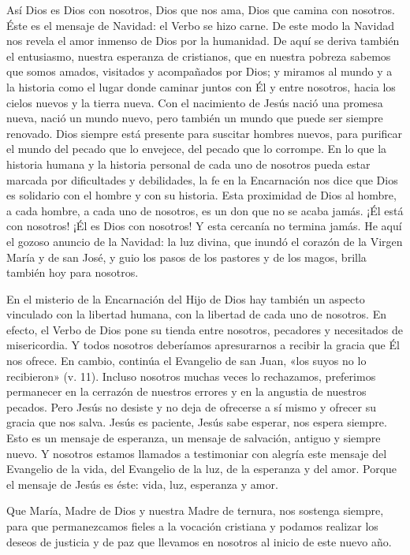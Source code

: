 \documentclass[]{article}
\begin{document}
Así Dios es Dios con nosotros, Dios que nos ama, Dios que camina con
nosotros. Éste es el mensaje de Navidad: el Verbo se hizo carne. De este
modo la Navidad nos revela el amor inmenso de Dios por la humanidad. De
aquí se deriva también el entusiasmo, nuestra esperanza de cristianos,
que en nuestra pobreza sabemos que somos amados, visitados y acompañados
por Dios; y miramos al mundo y a la historia como el lugar donde caminar
juntos con Él y entre nosotros, hacia los cielos nuevos y la tierra
nueva. Con el nacimiento de Jesús nació una promesa nueva, nació un
mundo nuevo, pero también un mundo que puede ser siempre renovado. Dios
siempre está presente para suscitar hombres nuevos, para purificar el
mundo del pecado que lo envejece, del pecado que lo corrompe. En lo que
la historia humana y la historia personal de cada uno de nosotros pueda
estar marcada por dificultades y debilidades, la fe en la Encarnación
nos dice que Dios es solidario con el hombre y con su historia. Esta
proximidad de Dios al hombre, a cada hombre, a cada uno de nosotros, es
un don que no se acaba jamás. ¡Él está con nosotros! ¡Él es Dios con
nosotros! Y esta cercanía no termina jamás. He aquí el gozoso anuncio de
la Navidad: la luz divina, que inundó el corazón de la Virgen María y de
san José, y guio los pasos de los pastores y de los magos, brilla
también hoy para nosotros.

En el misterio de la Encarnación del Hijo de Dios hay también un aspecto
vinculado con la libertad humana, con la libertad de cada uno de
nosotros. En efecto, el Verbo de Dios pone su tienda entre nosotros,
pecadores y necesitados de misericordia. Y todos nosotros deberíamos
apresurarnos a recibir la gracia que Él nos ofrece. En cambio, continúa
el Evangelio de san Juan, «los suyos no lo recibieron» (v. 11). Incluso
nosotros muchas veces lo rechazamos, preferimos permanecer en la
cerrazón de nuestros errores y en la angustia de nuestros pecados. Pero
Jesús no desiste y no deja de ofrecerse a sí mismo y ofrecer su gracia
que nos salva. Jesús es paciente, Jesús sabe esperar, nos espera
siempre. Esto es un mensaje de esperanza, un mensaje de salvación,
antiguo y siempre nuevo. Y nosotros estamos llamados a testimoniar con
alegría este mensaje del Evangelio de la vida, del Evangelio de la luz,
de la esperanza y del amor. Porque el mensaje de Jesús es éste: vida,
luz, esperanza y amor.

Que María, Madre de Dios y nuestra Madre de ternura, nos sostenga
siempre, para que permanezcamos fieles a la vocación cristiana y podamos
realizar los deseos de justicia y de paz que llevamos en nosotros al
inicio de este nuevo año.
\end{document}
